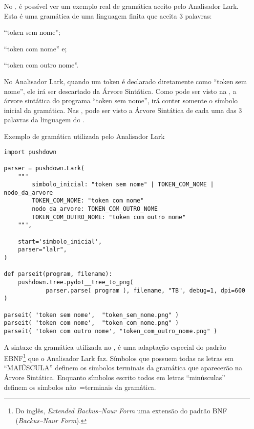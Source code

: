 No ,
é possível ver um exemplo real de gramática aceito pelo Analisador Lark.
Esta é uma gramática de uma linguagem finita que aceita 3 palavras:
\begin{inparaenum}[1)]
\item ``token sem nome'';
\item ``token com nome'' e;
\item ``token com outro nome''.
\end{inparaenum}%
No Analisador Lark,
quando um token é declarado diretamente como ``token sem nome'',
ele irá ser descartado da Árvore Sintática.
Como pode ser visto na ,
a árvore sintática do programa ``token sem nome'',
irá conter somente o símbolo inicial da gramática.
Nas ,
pode ser visto a Árvore Sintática de cada uma das 3 palavras da linguagem do .
\begin{code}
\caption{Exemplo de gramática utilizada pelo Analisador Lark}
\label{code:ExemploDeGramaticaLark}
\begin{verbatim}
import pushdown

parser = pushdown.Lark(
    """
        simbolo_inicial: "token sem nome" | TOKEN_COM_NOME | nodo_da_arvore
        TOKEN_COM_NOME: "token com nome"
        nodo_da_arvore: TOKEN_COM_OUTRO_NOME
        TOKEN_COM_OUTRO_NOME: "token com outro nome"
    """,

    start='simbolo_inicial',
    parser="lalr",
)

def parseit(program, filename):
    pushdown.tree.pydot__tree_to_png(
            parser.parse( program ), filename, "TB", debug=1, dpi=600 )

parseit( 'token sem nome',  "token_sem_nome.png" )
parseit( 'token com nome',  "token_com_nome.png" )
parseit( 'token com outro nome', "token_com_outro_nome.png" )
\end{verbatim}
\end{code}

A sintaxe da gramática utilizada no ,
é uma adaptação especial do padrão EBNF\footnote{
Do inglês,
\textit{Extended Backus–Naur Form} uma extensão do padrão BNF (\textit{Backus–Naur Form}).
}
\cite{teachingEbnf,antlrBookTerrentParr,larkGrammarReference,larkStyleCheat} que o Analisador Lark faz.
Símbolos que possuem todas as letras em ``MAIÚSCULA'' definem os símbolos terminais da gramática que aparecerão na Árvore Sintática.
Enquanto símbolos escrito todos em letras ``minúsculas'' definem os símbolos não~=terminais da gramática.

